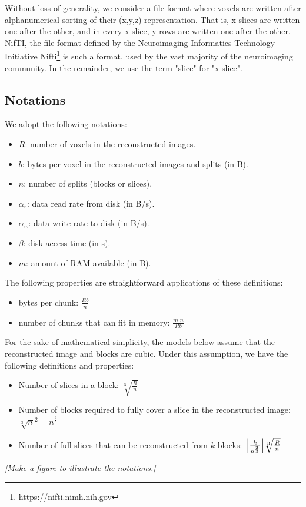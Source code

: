 \documentclass[10pt, conference, compsocconf]{IEEEtran}
\DeclarePairedDelimiter{\floor}{\lfloor}{\rfloor}
\newcommand{\todo}[1]{
  \color{red}\emph{[#1]}
  \color{black}
}
\begin{document}
Without loss of generality, we consider a file format where voxels are
written after alphanumerical sorting of their (x,y,z)
representation. That is, x slices are written one after the other, and
in every x slice, y rows are written one after the other. NifTI, the
file format defined by the Neuroimaging Informatics Technology
Initiative Nifti\footnote{\url{https://nifti.nimh.nih.gov}} is such a
format, used by the vast majority of the neuroimaging community. In
the remainder, we use the term "slice" for "x slice".

\subsection{Notations}

We adopt the following notations:
\begin{itemize}
\item $R$: number of voxels in the reconstructed images.
\item $b$: bytes per voxel in the reconstructed images and splits (in B).
\item $n$: number of splits (blocks or slices).
\item $\alpha_r$: data read rate from disk (in B/s).
\item $\alpha_w$: data write rate to disk (in B/s).
\item $\beta$: disk access time (in s).
\item $m$: amount of RAM available (in B).
\end{itemize}

The following properties are straightforward applications of these
definitions:
\begin{itemize}
\item bytes per chunk: $\frac{Rb}{n}$
\item number of chunks that can fit in memory: $\frac{m.n}{Rb}$
\end{itemize}
For the sake of mathematical simplicity, the models below assume that
the reconstructed image and blocks are cubic. Under this assumption,
we have the following definitions and properties:
\begin{itemize}
\item Number of slices in a block: $\sqrt[3]{\frac{R}{n}}$
\item Number of blocks required to fully cover a slice in the
  reconstructed image: $\sqrt[3]{n}^2=n^{\frac{2}{3}}$
  \item Number of full slices that can be reconstructed from $k$
    blocks: $\floor*{\frac{k}{n^{\frac{2}{3}}}}\sqrt[3]{\frac{R}{n}}$
\end{itemize}
\todo{Make a figure to illustrate the notations.}
\end{document}
